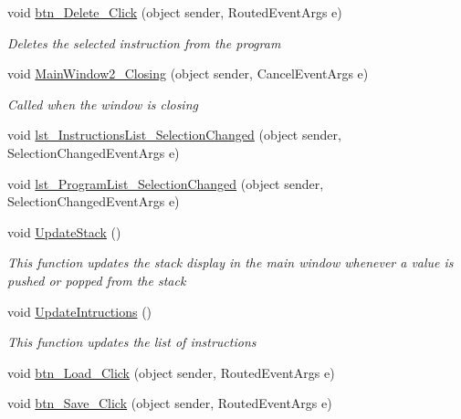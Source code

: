 \begin{DoxyCompactItemize}
void \hyperlink{class_c_p_u___o_s___simulator_1_1_main_window_a96ea1acde80b84701b58c1d4aaed2b9f}{btn\+\_\+\+Delete\+\_\+\+Click} (object sender, Routed\+Event\+Args e)
\begin{DoxyCompactList}\small\item\em Deletes the selected instruction from the program \end{DoxyCompactList}\item 
void \hyperlink{class_c_p_u___o_s___simulator_1_1_main_window_a622fd6a40ff66a4a87c3d31ccef4313c}{Main\+Window2\+\_\+\+Closing} (object sender, Cancel\+Event\+Args e)
\begin{DoxyCompactList}\small\item\em Called when the window is closing \end{DoxyCompactList}\item 
void \hyperlink{class_c_p_u___o_s___simulator_1_1_main_window_a5013d1984fc170246a5dc0d26c6fc493}{lst\+\_\+\+Instructions\+List\+\_\+\+Selection\+Changed} (object sender, Selection\+Changed\+Event\+Args e)
\item 
void \hyperlink{class_c_p_u___o_s___simulator_1_1_main_window_ab563b461cf3d62bd3c88eeb7921bfa75}{lst\+\_\+\+Program\+List\+\_\+\+Selection\+Changed} (object sender, Selection\+Changed\+Event\+Args e)
\item 
void \hyperlink{class_c_p_u___o_s___simulator_1_1_main_window_abd01bb7788b0c104045bcc93cf03c9d6}{Update\+Stack} ()
\begin{DoxyCompactList}\small\item\em This function updates the stack display in the main window whenever a value is pushed or popped from the stack \end{DoxyCompactList}\item 
void \hyperlink{class_c_p_u___o_s___simulator_1_1_main_window_a677bf9ebdb9fe30caa0f52f93e5390c9}{Update\+Intructions} ()
\begin{DoxyCompactList}\small\item\em This function updates the list of instructions \end{DoxyCompactList}\item 
void \hyperlink{class_c_p_u___o_s___simulator_1_1_main_window_a13c54c19f906fc84076fe654f82f5398}{btn\+\_\+\+Load\+\_\+\+Click} (object sender, Routed\+Event\+Args e)
\item 
void \hyperlink{class_c_p_u___o_s___simulator_1_1_main_window_a3bbf0774868d6b5da4ff08d70e236fa6}{btn\+\_\+\+Save\+\_\+\+Click} (object sender, Routed\+Event\+Args e)
\item 

\end{DoxyCompactItemize}
